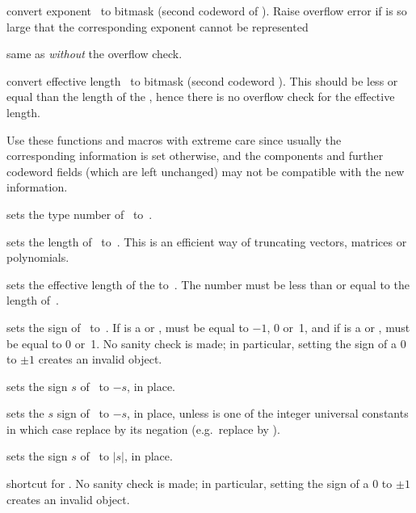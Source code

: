 convert exponent~ to bitmask (second
codeword of ). Raise overflow error if  is so
large that the corresponding exponent cannot be represented

 same as  \emph{without} the
overflow check.

 convert effective length~ to bitmask
(second codeword ). This should be less or equal than the length
of the , hence there is no overflow check for the effective length.

Use these functions and macros with extreme care since usually the
corresponding information is set otherwise, and the components and further
codeword fields (which are left unchanged) may not be compatible with the new
information.

 sets the type number of~ to~.

 sets the length of~ to~. This
is an efficient way of truncating vectors, matrices or polynomials.

 sets the effective length
of the   to~. The number  must be less than or
equal to the length of~.

 sets the sign of~ to~.
If  is a  or ,  must be equal to $-1$, 0
or~1, and if  is a  or ,  must be equal to 0
or~1. No sanity check is made; in particular, setting the sign of a
$0$  to $\pm1$ creates an invalid object.

 sets the sign $s$ of~ to $-s$, in place.

 sets the $s$ sign of~ to $-s$, in
place, unless  is one of the integer universal constants in which case
replace  by its negation (e.g.~replace  by ).

 sets the sign $s$ of~ to $|s|$, in place.

 shortcut for .
No sanity check is made; in particular, setting the sign of a
$0$  to $\pm1$ creates an invalid object.

